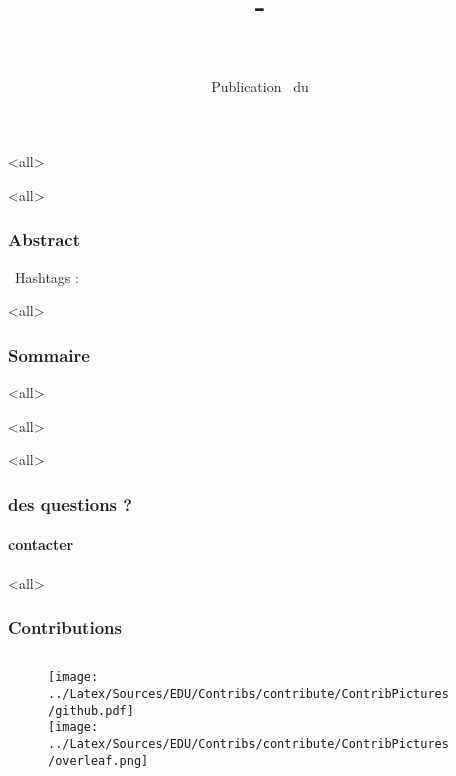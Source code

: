 \documentclass[ignorenonframetext,allowframebreaks,aspectratio=169,t,9pt, xcolor=table]{beamer}
\title[\ushorttitle]{\lessonID~-~\utitle}
\subtitle{\tiny\uCourseLongName}
\author[\uauthorwriter]{ \large{\uauthor} \\ \medskip {\small \url{\umaila} \and \url{\umailb}\\ {\small \url{\usitea}}}}
\institute[\uinstituteshort]{{\uinstitute \\ \uchaire}}
\date[\uversion]{\tiny{Publication \INFODistrib ~du \\ \DTMnow}}
\begin{document}
\mode<all>{}
\begin{frame}[plain]
                 \titlepage
\end{frame}

\mode<all>{}
\begin{frame}
	\frametitle{Abstract}
	\begin{techworkin} [righthand width=.6\textwidth]{\faCogs~\small {Hashtags} : \ukeywords}\uabstract
	\end{techworkin}
	\end{frame}
   

\mode<all>{}
\begin{frame}
\frametitle{Sommaire}
\begin{multicols}{2}
\tableofcontents[hideallsubsections]
\end{multicols}
\end{frame}

\mode<all>{}

\mode<all>{\ubody}


\mode<all>{}
\begin{frame}
\frametitle{des questions ?}
\framesubtitle{contacter \umaila}

\end{frame}

\mode<all>{}
\begin{frame}
\frametitle{Contributions}
\begin{columns}
\begin{column}{0.1\textwidth}

    \begin{figure}
           \centering
           \texttt{[image: ../Latex/Sources/EDU/Contribs/contribute/ContribPictures/github.pdf]}\\
                \texttt{[image: ../Latex/Sources/EDU/Contribs/contribute/ContribPictures/overleaf.png]}
 \end{figure}
\end{column}
\begin{column}{0.8\textwidth}
           
\end{column}
\end{columns}
\end{frame}
\end{document}
